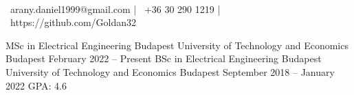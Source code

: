 \documentclass[]{awesome-cv}
\begin{document}
    
\begin{center}
	  \\
	\vspace{2mm}
	{\faEnvelope\ arany.daniel1999@gmail.com} | {\faMobile\ +36 30 290 1219} | {\faLink\ https://github.com/Goldan32}
\end{center}
\begin{cventries}
	\cventry
	{MSc in Electrical Engineering}
	{Budapest University of Technology and Economics}
	{Budapest}
	{February 2022 – Present}
	{}
	\cventry
	{BSc in Electrical Engineering}
	{Budapest University of Technology and Economics}
	{Budapest}
	{September 2018 – January 2022}
	{GPA: 4.6}
\end{cventries}
\end{document}

